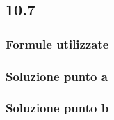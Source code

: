 \documentclass[../../main.tex]{subfiles}
\begin{document}
\subsection*{10.7}
\subsubsection*{Formule utilizzate}
\subsubsection*{Soluzione punto a}
\subsubsection*{Soluzione punto b}
\newpage
\end{document}
